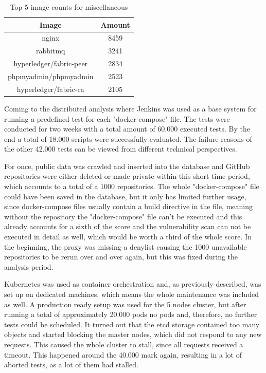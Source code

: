 \begin{table}[h!]
    \centering
    \begin{tabular}{ |c|c| }
    \hline
    Image & Amount \\
    \hline
         nginx & 8459 \\
         rabbitmq & 3241 \\
         hyperledger/fabric-peer & 2834 \\
         phpmyadmin/phpmyadmin & 2523 \\
         hyperledger/fabric-ca & 2105 \\
    \hline
    \end{tabular}
    \caption{Top 5 image counts for miscellaneous}
    \label{table_image_misc}
\end{table}



Coming to the distributed analysis where Jenkins was used as a base system for running a predefined test for each "docker-compose" file. The tests were conducted for two weeks with a total amount of 60.000 executed tests. By the end a total of 18.000 scripts were successfully evaluated. The failure reasons of the other 42.000 tests can be viewed from different technical perspectives.

For once, public data was crawled and inserted into the database and GitHub repositories were either deleted or made private within this short time period, which accounts to a total of a 1000 repositories. The whole "docker-compose" file could have been saved in the database, but it only has limited further usage, since docker-compose files usually contain a build directive in the file, meaning without the repository the "docker-compose" file can't be executed and this already accounts for a sixth of the score and the vulnerability scan can not be executed in detail as well, which would be worth a third of the whole score. In the beginning, the proxy was missing a denylist causing the 1000 unavailable repositories to be rerun over and over again, but this was fixed during the analysis period.

Kubernetes was used as container orchestration and, as previously described, was set up on dedicated machines, which means the whole maintenance was included as well. A production ready setup was used for the 5 nodes cluster, but after running a total of approximately 20.000 pods no pods and, therefore, no further tests could be scheduled. It turned out that the etcd storage contained too many objects and started blocking the master nodes, which did not respond to any new requests. This caused the whole cluster to stall, since all requests received a timeout. This happened around the 40.000 mark again, resulting in a lot of aborted tests, as a lot of them had stalled.

